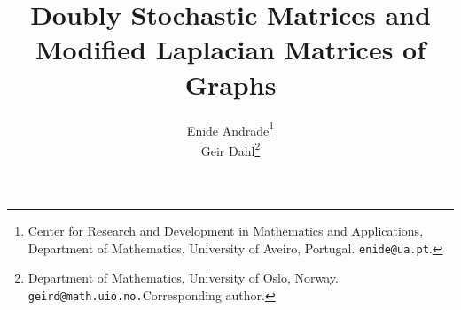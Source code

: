 \documentclass[12pt]{article}
\begin{document}
\title{Doubly Stochastic Matrices and Modified Laplacian Matrices  of Graphs}


\author{
 Enide Andrade\footnote{Center for Research and Development in Mathematics and Applications,
 Department of Mathematics,  University of Aveiro, Portugal. {\tt enide@ua.pt}.}\\
 Geir Dahl\footnote{Department of Mathematics,   University of Oslo, Norway. {\tt geird@math.uio.no.}Corresponding author.} 
 }

\maketitle



\date{}




\end{document}
